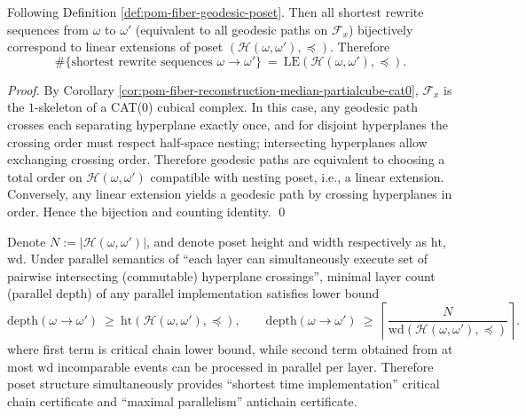 \begin{theorem}\label{thm:pom-fiber-geodesic-linear-extension}
Following Definition \ref{def:pom-fiber-geodesic-poset}.
Then all shortest rewrite sequences from \(\omega\) to \(\omega'\) (equivalent to all geodesic paths on \(\mathcal F_x\)) bijectively correspond to linear extensions of poset \((\mathcal H(\omega,\omega'),\preceq)\).
Therefore
\[
\#\{\text{shortest rewrite sequences } \omega\to \omega'\}
\ =\
\mathrm{LE}(\mathcal H(\omega,\omega'),\preceq).
\]
\end{theorem}
\begin{proof}
By Corollary \ref{cor:pom-fiber-reconstruction-median-partialcube-cat0}, \(\mathcal F_x\) is the \(1\)-skeleton of a CAT(0) cubical complex.
In this case, any geodesic path crosses each separating hyperplane exactly once, and for disjoint hyperplanes the crossing order must respect half-space nesting;
intersecting hyperplanes allow exchanging crossing order.
Therefore geodesic paths are equivalent to choosing a total order on \(\mathcal H(\omega,\omega')\) compatible with nesting poset, i.e., a linear extension.
Conversely, any linear extension yields a geodesic path by crossing hyperplanes in order.
Hence the bijection and counting identity. \qed
\end{proof}

\begin{corollary}\label{cor:pom-fiber-parallelism-poset}
Denote \(N:=|\mathcal H(\omega,\omega')|\), and denote poset height and width respectively as \(\mathrm{ht}\), \(\mathrm{wd}\).
Under parallel semantics of ``each layer can simultaneously execute set of pairwise intersecting (commutable) hyperplane crossings'',
minimal layer count (parallel depth) of any parallel implementation satisfies lower bound
\[
\mathrm{depth}(\omega\to\omega')\ \ge\ \mathrm{ht}(\mathcal H(\omega,\omega'),\preceq),
\qquad
\mathrm{depth}(\omega\to\omega')\ \ge\ \left\lceil \frac{N}{\mathrm{wd}(\mathcal H(\omega,\omega'),\preceq)}\right\rceil.
\]
where first term is critical chain lower bound, while second term obtained from at most \(\mathrm{wd}\) incomparable events can be processed in parallel per layer.
Therefore poset structure simultaneously provides ``shortest time implementation'' critical chain certificate and ``maximal parallelism'' antichain certificate.
\end{corollary}

